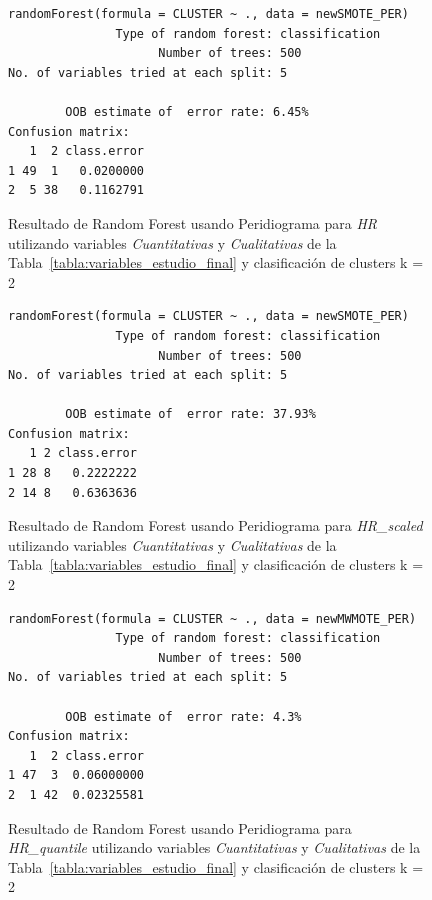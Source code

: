 \begin{figure}[H]
    \centering
    \begin{lstlisting}[frame=single, basicstyle=\small\ttfamily]
        randomForest(formula = CLUSTER ~ ., data = newSMOTE_PER) 
               Type of random forest: classification
                     Number of trees: 500
No. of variables tried at each split: 5

        OOB estimate of  error rate: 6.45%
Confusion matrix:
   1  2 class.error
1 49  1   0.0200000
2  5 38   0.1162791
    \end{lstlisting}
    \caption{Resultado de Random Forest usando Peridiograma para \textit{HR} utilizando variables \textit{Cuantitativas} y \textit{Cualitativas} de la Tabla~\ref{tabla:variables_estudio_final} y clasificación de clusters k = 2}\label{fig:random_forest_per_result_1}
\end{figure}
\begin{figure}[H]
    \centering
    \begin{lstlisting}[frame=single, basicstyle=\small\ttfamily]
        randomForest(formula = CLUSTER ~ ., data = newSMOTE_PER) 
               Type of random forest: classification
                     Number of trees: 500
No. of variables tried at each split: 5

        OOB estimate of  error rate: 37.93%
Confusion matrix:
   1 2 class.error
1 28 8   0.2222222
2 14 8   0.6363636
    \end{lstlisting}
    \caption{Resultado de Random Forest usando Peridiograma para \textit{HR\_scaled} utilizando variables \textit{Cuantitativas} y \textit{Cualitativas} de la Tabla~\ref{tabla:variables_estudio_final} y clasificación de clusters k = 2}
    \label{fig:random_forest_per_result_2}
\end{figure}

\begin{figure}[H]
    \centering
    \begin{lstlisting}[frame=single, basicstyle=\small\ttfamily]
        randomForest(formula = CLUSTER ~ ., data = newMWMOTE_PER) 
               Type of random forest: classification
                     Number of trees: 500
No. of variables tried at each split: 5

        OOB estimate of  error rate: 4.3%
Confusion matrix:
   1  2 class.error
1 47  3  0.06000000
2  1 42  0.02325581
    \end{lstlisting}
    \caption{Resultado de Random Forest usando Peridiograma para \textit{HR\_quantile} utilizando variables \textit{Cuantitativas} y \textit{Cualitativas} de la Tabla~\ref{tabla:variables_estudio_final} y clasificación de clusters k = 2}
    \label{fig:random_forest_per_result_3}
\end{figure}

